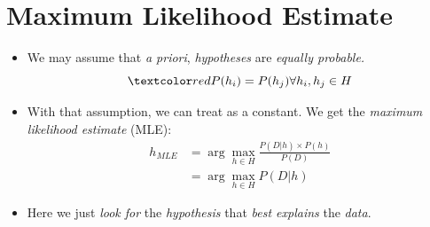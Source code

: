 \documentclass[
	number={3},
	title={Na\"iive Bayes Learning}
]{cs584notes}
\begin{document}
\section{Maximum Likelihood Estimate}\label{sec:maximum-likelihood-estimate}
\begin{itemize}
	\item We may assume that \emph{a priori}, \emph{hypotheses} are \emph{equally probable.}
	\[ \data{ P(h_{i}) = P(h_{j}) \forall h_{i}, h_{j} \in H } \]
	\item With that assumption, we can treat  as a constant. We get the \emph{maximum likelihood estimate} (MLE):
	\begin{equation}[eqred]
		\begin{aligned}
			h_{MLE} &= \arg\max_{h\in H} \frac{P(D|h)\times P(h)}{P(D)}\\
					&= \arg\max_{h\in H} P(D|h)
		\end{aligned}
		\label{eq:mle}
	\end{equation}
	\item Here we just \emph{look for} the \emph{hypothesis} that \emph{best explains} the \emph{data}.
\end{itemize}
\end{document}
